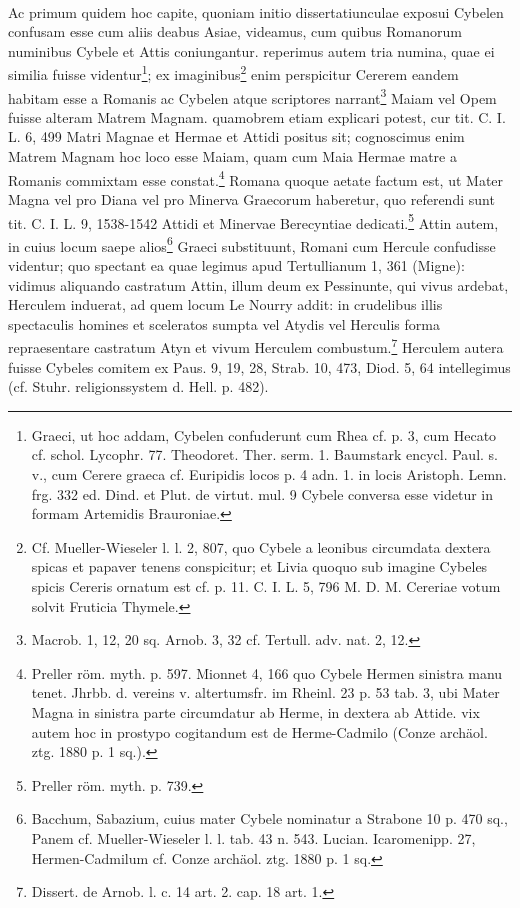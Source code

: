 \documentclass[a4paper, 11pt, oneside, polutonikogreek, german, twocolumn]{article}
\begin{document}
\paragraph{}
Ac primum quidem hoc capite, quoniam initio dissertatiunculae exposui Cybelen confusam esse cum aliis deabus Asiae, videamus, cum quibus Romanorum numinibus Cybele et Attis coniungantur. reperimus autem tria numina, quae ei similia fuisse videntur\footnote{Graeci, ut hoc addam, Cybelen confuderunt cum Rhea cf. p. 3, cum Hecato cf. schol. Lycophr. 77. Theodoret. Ther. serm. 1. Baumstark encycl. Paul. s. v., cum Cerere graeca cf. Euripidis locos p. 4 adn. 1. in locis Aristoph. Lemn. frg. 332 ed. Dind. et Plut. de virtut. mul. 9 Cybele conversa esse videtur in formam Artemidis Brauroniae.}; ex imaginibus\footnote{Cf. Mueller-Wieseler l. l. 2, 807, quo Cybele a leonibus circumdata dextera spicas et papaver tenens conspicitur; et Livia quoquo sub imagine Cybeles spicis Cereris ornatum est cf. p. 11. C. I. L. 5, 796 M. D. M. Cereriae votum solvit Fruticia Thymele.} enim perspicitur Cererem eandem habitam esse a Romanis ac Cybelen atque scriptores narrant\footnote{Macrob. 1, 12, 20 sq. Arnob. 3, 32 cf. Tertull. adv. nat. 2, 12.} Maiam vel Opem fuisse alteram Matrem Magnam. quamobrem etiam explicari potest, cur tit. C. I. L. 6, 499 Matri Magnae et Hermae et Attidi positus sit; cognoscimus enim Matrem Magnam hoc loco esse Maiam, quam cum Maia Hermae matre a Romanis commixtam esse constat.\footnote{Preller röm. myth. p. 597. Mionnet 4, 166 quo Cybele Hermen sinistra manu tenet. Jhrbb. d. vereins v. altertumsfr. im Rheinl. 23 p. 53 tab. 3, ubi Mater Magna in sinistra parte circumdatur ab Herme, in dextera ab Attide. vix autem hoc in prostypo cogitandum est de Herme-Cadmilo (Conze archäol. ztg. 1880 p. 1 sq.).} Romana quoque aetate factum est, ut Mater Magna vel pro Diana vel pro Minerva Graecorum haberetur, quo referendi sunt tit. C. I. L. 9, 1538-1542 Attidi et Minervae Berecyntiae dedicati.\footnote{Preller röm. myth. p. 739.} Attin autem, in cuius locum saepe alios\footnote{Bacchum, Sabazium, cuius mater Cybele nominatur a Strabone 10 p. 470 sq., Panem cf. Mueller-Wieseler l. l. tab. 43 n. 543. Lucian. Icaromenipp. 27, Hermen-Cadmilum cf. Conze archäol. ztg. 1880 p. 1 sq.} Graeci substituunt, Romani cum Hercule confudisse videntur; quo spectant ea quae legimus apud Tertullianum 1, 361 (Migne): vidimus aliquando castratum Attin, illum deum ex Pessinunte, qui vivus ardebat, Herculem induerat, ad quem locum Le Nourry addit: in crudelibus illis spectaculis homines et sceleratos sumpta vel Atydis vel Herculis forma repraesentare castratum Atyn et vivum Herculem combustum.\footnote{Dissert. de Arnob. l. c. 14 art. 2. cap. 18 art. 1.} Herculem autera fuisse Cybeles comitem ex Paus. 9, 19, 28, Strab. 10, 473, Diod. 5, 64 intellegimus (cf. Stuhr. religionssystem d. Hell. p. 482).
\end{document}

